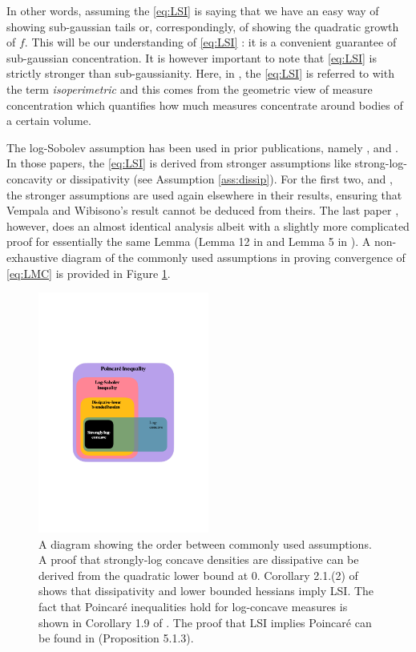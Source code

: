 \documentclass[11pt,twoside]{article}
\theoremstyle{definition}
\begin{document}
In other words, assuming the \eqref{eq:LSI} is saying that we have an easy way of showing sub-gaussian tails or, correspondingly, of showing the quadratic growth of $f$. This will be our understanding of \eqref{eq:LSI} : it is a convenient guarantee of sub-gaussian concentration. It is however important to note that \eqref{eq:LSI} is strictly stronger than sub-gaussianity. Here, in \cite{vempala_rapid_2019}, the \eqref{eq:LSI} is referred to with the term \textit{isoperimetric} and this comes from the geometric view of measure concentration which quantifies how much measures concentrate around bodies of a certain volume.

The log-Sobolev assumption has been used in prior publications, namely \cite{dalalyan_theoretical_2014},  \cite{raginsky_non-convex_2017} and \cite{ma_sampling_2019}. In those papers, the \eqref{eq:LSI} is derived from stronger assumptions like strong-log-concavity or dissipativity (see Assumption \ref{ass:dissip}). For the first two, \cite{dalalyan_theoretical_2014} and \cite{raginsky_non-convex_2017}, the stronger assumptions are used again elsewhere in their results, ensuring that Vempala and Wibisono's result cannot be deduced from theirs. The last paper \cite{ma_sampling_2019}, however, does an almost identical analysis albeit with a slightly more complicated proof for essentially the same Lemma (Lemma 12 in \cite{vempala_rapid_2019} and Lemma 5 in \cite{ma_sampling_2019}). A non-exhaustive diagram of the commonly used assumptions in proving convergence of \eqref{eq:LMC} is provided in Figure \ref{fig:diagram}.
\begin{figure}
    \centering
    \includegraphics[width=0.5\textwidth]{diagram.pdf}
    \caption{A diagram showing the order between commonly used assumptions.  A proof that strongly-log concave densities are dissipative can be derived from the quadratic lower bound at $0$. Corollary 2.1.(2) of \cite{cattiaux_note_2010} shows that dissipativity and lower bounded hessians imply LSI. The fact that Poincar\'e inequalities  hold for log-concave measures is shown in Corollary 1.9 of \cite{bakry_simple_2008}. The proof that LSI implies Poincar\'e can be found in \cite{bakry_markov_2014}(Proposition 5.1.3).}
    \label{fig:diagram}
\end{figure}
\end{document}
